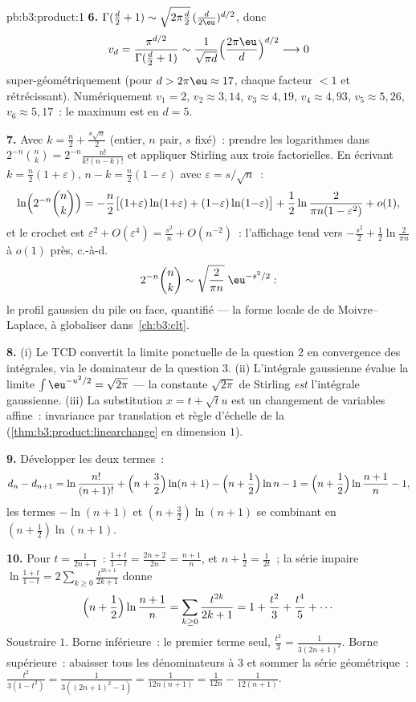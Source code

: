 \begin{solution}{pb:b3:product:1}
\textbf{6.} $\Gamma(\frac d2 + 1) \sim \sqrt{2\pi\frac
d2}\,(\frac d{2\eu})^{d/2}$, donc
\[
v_d = \frac{\pi^{d/2}}{\Gamma(\frac d2 + 1)}
\sim \frac{1}{\sqrt{\pi d}}\Bigl(\frac{2\pi\eu}
d\Bigr)^{d/2} \longrightarrow 0
\]
super-géométriquement (pour $d > 2\pi\eu \approx 17$, chaque
facteur $< 1$ et rétrécissant). Numériquement $v_1 = 2$, $v_2
\approx 3{,}14$, $v_3 \approx 4{,}19$, $v_4 \approx 4{,}93$,
$v_5 \approx 5{,}26$, $v_6 \approx 5{,}17$~: le maximum est
en $d = 5$.

\textbf{7.} Avec $k = \frac n2 + \frac{s\sqrt n}2$ (entier,
$n$ pair, $s$ fixé)~: prendre les logarithmes dans
$2^{-n}\binom nk = 2^{-n}\frac{n!}{k!(n-k)!}$ et appliquer
Stirling aux trois factorielles. En écrivant $k =
\frac n2(1 + \varepsilon)$, $n - k = \frac n2(1 -
\varepsilon)$ avec $\varepsilon = s/\sqrt n$~:
\[
\ln\Bigl(2^{-n}\binom nk\Bigr)
= -\frac n2\bigl[(1{+}\varepsilon)\ln(1{+}\varepsilon) +
(1{-}\varepsilon)\ln(1{-}\varepsilon)\bigr]
+ \frac12\ln\frac{2}{\pi n(1 - \varepsilon^2)} + o(1),
\]
et le crochet est $\varepsilon^2 + O(\varepsilon^4) =
\frac{s^2}n + O(n^{-2})$~: l'affichage tend vers
$-\frac{s^2}2 + \frac12\ln\frac2{\pi n}$ à $o(1)$ près,
c.-à-d.
\[
2^{-n}\binom nk \sim \sqrt{\frac{2}{\pi
n}}\;\eu^{-s^2/2} :
\]
le profil gaussien du pile ou face, quantifié --- la forme
locale de de Moivre--Laplace, à globaliser
dans~\cref{ch:b3:clt}.

\textbf{8.} (i) Le TCD convertit la limite ponctuelle de la
question 2 en convergence des intégrales, via le dominateur
de la question 3. (ii) L'intégrale gaussienne évalue la
limite $\int\eu^{-u^2/2} = \sqrt{2\pi}$ --- la constante
$\sqrt{2\pi}$ de Stirling \emph{est} l'intégrale
gaussienne. (iii) La substitution $x = t + \sqrt tu$ est un
changement de variables affine~: invariance par translation
et règle d'échelle de la 
(\cref{thm:b3:product:linearchange} en dimension $1$).

\textbf{9.} Développer les deux termes~:
\[
d_n - d_{n+1} = \ln\frac{n!}{(n+1)!} + \Bigl(n +
\frac32\Bigr)\ln(n+1) - \Bigl(n + \frac12\Bigr)\ln n - 1
= \Bigl(n + \frac12\Bigr)\ln\frac{n+1}n - 1,
\]
les termes $-\ln(n+1)$ et $(n + \frac32)\ln(n+1)$ se
combinant en $(n + \frac12)\ln(n+1)$.

\textbf{10.} Pour $t = \frac1{2n+1}$~: $\frac{1+t}{1-t} =
\frac{2n+2}{2n} = \frac{n+1}n$, et $n + \frac12 =
\frac1{2t}$~; la série impaire $\ln\frac{1+t}{1-t} =
2\sum_{k\geq0}\frac{t^{2k+1}}{2k+1}$ donne
\[
\Bigl(n + \frac12\Bigr)\ln\frac{n+1}n
= \sum_{k\geq0}\frac{t^{2k}}{2k+1}
= 1 + \frac{t^2}3 + \frac{t^4}5 + \cdots
\]
Soustraire $1$. Borne inférieure~: le premier terme seul,
$\frac{t^2}3 = \frac1{3(2n+1)^2}$. Borne supérieure~:
abaisser tous les dénominateurs à $3$ et sommer la série
géométrique~: $\frac{t^2}{3(1 - t^2)} =
\frac1{3((2n+1)^2 - 1)} = \frac1{12n(n+1)} = \frac1{12n} -
\frac1{12(n+1)}$.


\end{solution}
